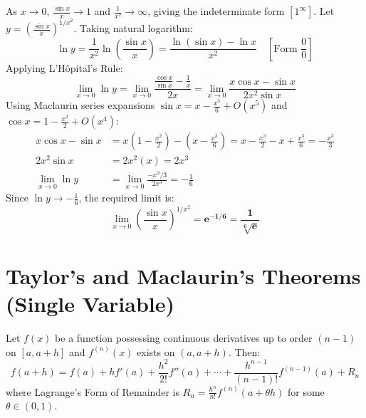 \begin{solutionbox}
As $x \to 0$, $\frac{\sin x}{x} \to 1$ and $\frac{1}{x^2} \to \infty$, giving the indeterminate form ${[1^\infty]}$.
Let $y = \left(\frac{\sin x}{x}\right)^{1/x^2}$. Taking natural logarithm:
\begin{equation*}
    \ln y = \frac{1}{x^2} \ln\left(\frac{\sin x}{x}\right) = \frac{\ln(\sin x) - \ln x}{x^2} \quad \left[\text{Form } \frac{0}{0}\right]
\end{equation*}
Applying L'H\^opital's Rule:
\begin{equation*}
    \lim_{x\to 0} \ln y = \lim_{x\to 0} \frac{\frac{\cos x}{\sin x} - \frac{1}{x}}{2x} = \lim_{x\to 0} \frac{x\cos x - \sin x}{2x^2 \sin x}
\end{equation*}
Using Maclaurin series expansions $\sin x = x - \frac{x^3}{6} + O(x^5)$ and $\cos x = 1 - \frac{x^2}{2} + O(x^4)$:
\begin{align*}
    x\cos x - \sin x &= x\left(1 - \frac{x^2}{2}\right) - \left(x - \frac{x^3}{6}\right) = x - \frac{x^3}{2} - x + \frac{x^3}{6} = -\frac{x^3}{3} \\
    2x^2 \sin x &= 2x^2(x) = 2x^3 \\
    \lim_{x\to 0} \ln y &= \lim_{x\to 0} \frac{-x^3 / 3}{2x^3} = -\frac{1}{6}
\end{align*}
Since $\ln y \to -\frac{1}{6}$, the required limit is:
\begin{equation*}
    \lim_{x\to 0} \left(\frac{\sin x}{x}\right)^{1/x^2} = \mathbf{e^{-1/6}} = \mathbf{\frac{1}{\sqrt[6]{e}}}
\end{equation*}
\end{solutionbox}

\section{Taylor's and Maclaurin's Theorems (Single Variable)}

\begin{theorem}
Let $f(x)$ be a function possessing continuous derivatives up to order $(n-1)$ on $[a, a+h]$ and $f^{(n)}(x)$ exists on $(a, a+h)$. Then:
\begin{equation}
    f(a+h) = f(a) + h f'(a) + \frac{h^2}{2!} f''(a) + \cdots + \frac{h^{n-1}}{(n-1)!} f^{(n-1)}(a) + R_n
\end{equation}
where Lagrange's Form of Remainder is $R_n = \frac{h^n}{n!} f^{(n)}(a + \theta h)$ for some $\theta \in (0,1)$.
\end{theorem}

